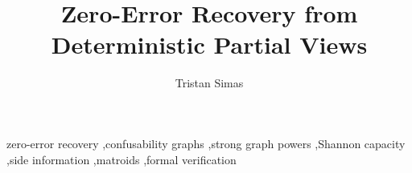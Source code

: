 \documentclass[preprint,12pt]{elsarticle}
\begin{document}
\begin{frontmatter}

\title{Zero-Error Recovery from Deterministic Partial Views}

\author[mcgill]{Tristan Simas}
\address[mcgill]{McGill University, 845 Sherbrooke Street West, Montreal, QC H3A 0G4, Canada}

\begin{abstract}

\end{abstract}

\begin{keyword}
zero-error recovery \sep confusability graphs \sep strong graph powers \sep Shannon capacity \sep side information \sep matroids \sep formal verification
\end{keyword}

\end{frontmatter}





















\appendix


\end{document}
